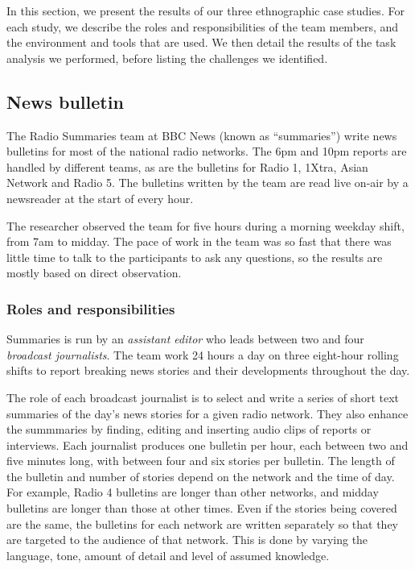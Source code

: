 In this section, we present the results of our three ethnographic case studies. For each study, we describe the roles
and responsibilities of the team members, and the environment and tools that are used. We then detail the results of
the task analysis we performed, before listing the challenges we identified.


\subsection{News bulletin}\label{sec:news}
The Radio Summaries team at BBC News (known as ``summaries'') write news bulletins for most of the national radio
networks. The 6pm and 10pm reports are handled by different teams, as are the bulletins for Radio 1, 1Xtra, Asian
Network and Radio 5.  The bulletins written by the team are read live on-air by a newsreader at the start of every
hour.

The researcher observed the team for five hours during a morning weekday shift, from 7am to midday. The pace of work in
the team was so fast that there was little time to talk to the participants to ask any questions, so the results are
mostly based on direct observation.

\subsubsection{Roles and responsibilities}\label{sec:news-roles}
Summaries is run by an \textit{assistant editor} who leads between two and four \textit{broadcast journalists}. The
team work 24 hours a day on three eight-hour rolling shifts to report breaking news stories and their developments
throughout the day.

The role of each broadcast journalist is to select and write a series of short text summaries of the day's news stories
for a given radio network.  They also enhance the summmaries by finding, editing and inserting audio clips of reports
or interviews.  Each journalist produces one bulletin per hour, each between two and five minutes long, with between
four and six stories per bulletin.  The length of the bulletin and number of stories depend on the network and the time
of day. For example, Radio 4 bulletins are longer than other networks, and midday bulletins are longer than those at
other times. Even if the stories being covered are the same, the bulletins for each network are written separately so
that they are targeted to the audience of that network.  This is done by varying the language, tone, amount of detail
and level of assumed knowledge.


